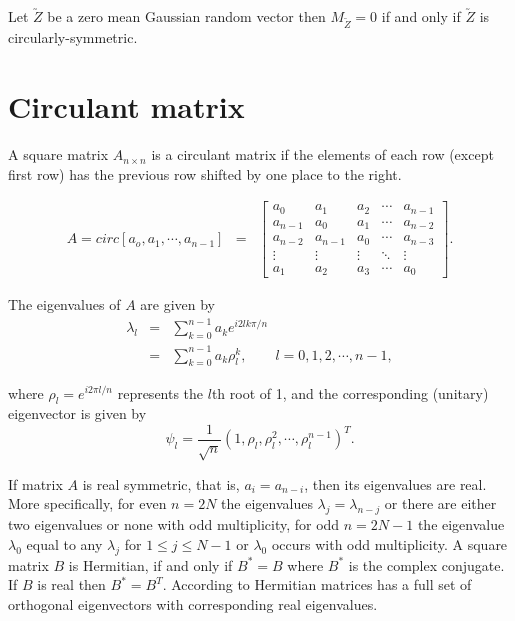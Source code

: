 \begin{theorem}[Gallager, 2008] \label{circular_theory} \hfill \\
	Let $\utilde{Z}$ be a zero mean Gaussian random vector then $M_{\utilde{Z}}=0$ if and only if $\utilde{Z}$ is circularly-symmetric.
\end{theorem}

\vskip 8pt

\section{Circulant matrix} \label{circulant}

A square matrix $A_{n\times n}$ is a circulant matrix if the elements of each row (except first row) has the previous row shifted by one place to the right.

\begin{eqnarray}
	A = circ[a_o, a_1,\cdots,a_{n-1}] &=& \left[
		\begin{array}{lllll}
			a_0     & a_1     & a_2    & \cdots & a_{n-1} \\
			a_{n-1} & a_0     & a_1    & \cdots & a_{n-2} \\
			a_{n-2} & a_{n-1} & a_0    & \cdots & a_{n-3} \\
			\vdots  & \vdots  & \vdots & \ddots & \vdots  \\
			a_1     & a_2     & a_3    & \cdots & a_0
		\end{array}
	\right].
\end{eqnarray}

The eigenvalues of $A$ are given by
\begin{eqnarray*}
	\lambda_l & = & \sum_{k=0}^{n-1} a_k e^{i2lk\pi/n} \\
	& = & \sum_{k=0}^{n-1}a_k \rho_l^k, \quad \quad l = 0, 1, 2, \cdots, n-1,
\end{eqnarray*}

where $\rho_l = e^{i2\pi l/n}$ represents the $l$th root of 1, and the corresponding (unitary) eigenvector is given by
\[
	\psi_l = \frac{1}{\sqrt{n}}(1, \rho_l, \rho_l^2, \cdots, \rho_l^{n-1})^T.
\]

If matrix $A$ is real symmetric, that is, $a_i = a_{n-i}$, then its eigenvalues are real. More specifically, for even $n=2N$ the eigenvalues $\lambda_j = \lambda_{n-j}$ or there are either two eigenvalues or none with odd multiplicity, for odd $n=2N-1$ the eigenvalue $\lambda_0$ equal to any $\lambda_j$ for $1\le j \le N-1$ or $\lambda_0$ occurs with odd multiplicity. A square matrix $B$ is Hermitian, if and only if $B^* = B$ where $B^*$ is the complex conjugate. If $B$ is real then $B^* = B^T$. According to \cite{Tee2005} Hermitian matrices has a full set of orthogonal eigenvectors with corresponding real eigenvalues.\\


